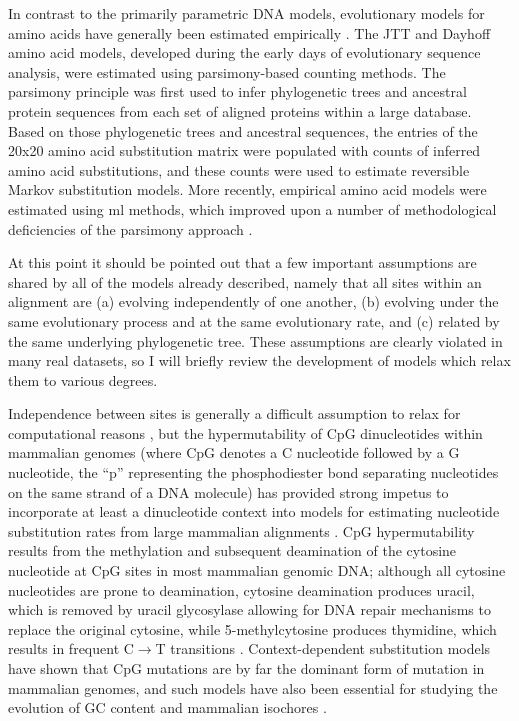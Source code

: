 In contrast to the primarily parametric DNA models, evolutionary
models for amino acids have generally been estimated empirically
\citep{Whelan2001}. The JTT \citep{Jones1992} and Dayhoff
\citep{Dayhoff1978} amino acid models, developed during the early days
of evolutionary sequence analysis, were estimated using
parsimony-based counting methods. The parsimony principle was first
used to infer phylogenetic trees and ancestral protein sequences from
each set of aligned proteins within a large database. Based on those
phylogenetic trees and ancestral sequences, the entries of the 20x20
amino acid substitution matrix were populated with counts of inferred
amino acid substitutions, and these counts were used to estimate
reversible Markov substitution models. More recently, empirical amino
acid models were estimated using \ac{ml} methods, which improved upon
a number of methodological deficiencies of the parsimony approach
\citep{Adachi1996,Whelan2001b}.

At this point it should be pointed out that a few important
assumptions are shared by all of the models already described, namely
that all sites within an alignment are (a) evolving independently of
one another, (b) evolving under the same evolutionary process and at
the same evolutionary rate, and (c) related by the same underlying
phylogenetic tree. These assumptions are clearly violated in many real
datasets, so I will briefly review the development of models which
relax them to various degrees.

Independence between sites is generally a difficult assumption to
relax for computational reasons \citep{Kosiol2006c}, but the
hypermutability of CpG dinucleotides within mammalian genomes (where
CpG denotes a C nucleotide followed by a G nucleotide, the ``p''
representing the phosphodiester bond separating nucleotides on the
same strand of a DNA molecule) has provided strong impetus to
incorporate at least a dinucleotide context into models for estimating
nucleotide substitution rates from large mammalian alignments
\citep{Blake1992,Hwang2004a,Siepel2004a}. CpG hypermutability results
from the methylation and subsequent deamination of the cytosine
nucleotide at CpG sites in most mammalian genomic DNA; although all
cytosine nucleotides are prone to deamination, cytosine deamination
produces uracil, which is removed by uracil glycosylase allowing for
DNA repair mechanisms to replace the original cytosine, while
5-methylcytosine produces thymidine, which results in frequent C$\to$T
transitions \citep{Ehrlich1982,Hwang2004a}. Context-dependent
substitution models have shown that CpG mutations are by far the
dominant form of mutation in mammalian genomes, and such models have
also been essential for studying the evolution of GC content and
mammalian isochores \citep{Duret2006,Duret2008}.

